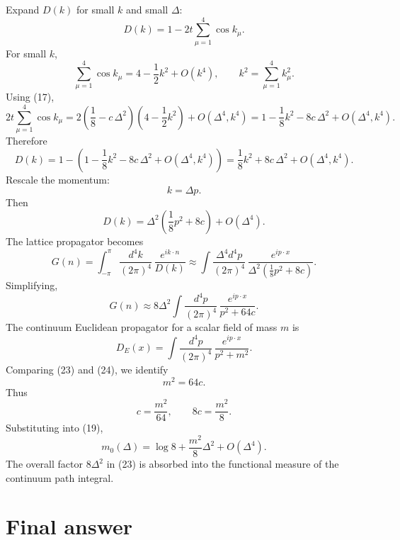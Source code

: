 \documentclass[12pt]{article}
\begin{document}
Expand \(D(k)\) for small \(k\) and small \(\Delta\):
\[
D(k)=1-2t\sum_{\mu=1}^4\cos k_\mu.
\]
For small \(k\),
\[
\sum_{\mu=1}^4\cos k_\mu
=
4-\frac12 k^2+O(k^4),
\qquad
k^2=\sum_{\mu=1}^4 k_\mu^2.
\]
Using (17),
\[
2t\sum_{\mu=1}^4\cos k_\mu
=
2\left(\frac18-c\,\Delta^2\right)
\left(4-\frac12 k^2\right)
+O(\Delta^4,k^4)
=
1-\frac18 k^2-8c\,\Delta^2+O(\Delta^4,k^4).
\]
Therefore
\begin{equation}
D(k)
=
1-\left(1-\frac18 k^2-8c\,\Delta^2+O(\Delta^4,k^4)\right)
=
\frac18 k^2+8c\,\Delta^2+O(\Delta^4,k^4).
\tag{21}
\end{equation}
Rescale the momentum:
\[
k=\Delta p.
\]
Then
\begin{equation}
D(k)
=
\Delta^2\left(\frac18 p^2+8c\right)+O(\Delta^4).
\tag{22}
\end{equation}
The lattice propagator becomes
\[
G(n)
=
\int_{-\pi}^{\pi}\frac{d^4k}{(2\pi)^4}\,
\frac{e^{ik\cdot n}}{D(k)}
\approx
\int
\frac{\Delta^4 d^4p}{(2\pi)^4}\,
\frac{e^{ip\cdot x}}{
\Delta^2\left(\frac18 p^2+8c\right)
}.
\]
Simplifying,
\begin{equation}
G(n)
\approx
8\Delta^2
\int
\frac{d^4p}{(2\pi)^4}\,
\frac{e^{ip\cdot x}}{
p^2+64c
}.
\tag{23}
\end{equation}
The continuum Euclidean propagator for a scalar field of mass \(m\) is
\begin{equation}
D_E(x)
=
\int
\frac{d^4p}{(2\pi)^4}\,
\frac{e^{ip\cdot x}}{
p^2+m^2
}.
\tag{24}
\end{equation}
Comparing (23) and (24), we identify
\begin{equation}
\boxed{
m^2=64c.
}
\tag{25}
\end{equation}
Thus
\[
c=\frac{m^2}{64},
\qquad
8c=\frac{m^2}{8}.
\]
Substituting into (19),
\begin{equation}
\boxed{
m_0(\Delta)
=
\log 8+\frac{m^2}{8}\Delta^2+O(\Delta^4).
}
\tag{26}
\end{equation}
The overall factor \(8\Delta^2\) in (23) is absorbed into the functional measure of the continuum path integral.

\section*{Final answer}
\end{document}

